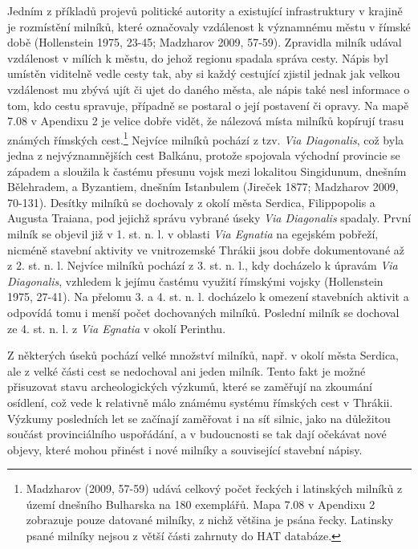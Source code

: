 Jedním z příkladů projevů politické autority a existující infrastruktury v krajině je rozmístění milníků, které označovaly vzdálenost k významnému městu v římské době (Hollenstein 1975, 23-45; Madzharov 2009, 57-59). Zpravidla milník udával vzdálenost v mílích k městu, do jehož regionu spadala správa cesty. Nápis byl umístěn viditelně vedle cesty tak, aby si každý cestující zjistil jednak jak velkou vzdálenost mu zbývá ujít či ujet do daného města, ale nápis také nesl informace o tom, kdo cestu spravuje, případně se postaral o její postavení či opravy. Na mapě 7.08 v Apendixu 2 je velice dobře vidět, že nálezová místa milníků kopírují trasu známých římských cest.\footnote{Madzharov (2009, 57-59) udává celkový počet řeckých i latinských milníků z území dnešního Bulharska na 180 exemplářů. Mapa 7.08 v Apendixu 2 zobrazuje pouze datované milníky, z nichž většina je psána řecky. Latinsky psané milníky nejsou z větší části zahrnuty do HAT databáze.} Nejvíce milníků pochází z tzv. {\em Via Diagonalis}, což byla jedna z nejvýznamnějších cest Balkánu, protože spojovala východní provincie se západem a sloužila k častému přesunu vojsk mezi lokalitou Singidunum, dnešním Bělehradem, a Byzantiem, dnešním Istanbulem (Jireček 1877; Madzharov 2009, 70-131). Desítky milníků se dochovaly z okolí města Serdica, Filippopolis a Augusta Traiana, pod jejichž správu vybrané úseky {\em Via Diagonalis} spadaly. První milník se objevil již v 1. st. n. l. v oblasti {\em Via Egnatia} na egejském pobřeží, nicméně stavební aktivity ve vnitrozemské Thrákii jsou dobře dokumentované až z 2. st. n. l. Nejvíce milníků pochází z 3. st. n. l., kdy docházelo k úpravám {\em Via Diagonalis}, vzhledem k jejímu častému využití římskými vojsky (Hollenstein 1975, 27-41). Na přelomu 3. a 4. st. n. l. docházelo k omezení stavebních aktivit a odpovídá tomu i menší počet dochovaných milníků. Poslední milník se dochoval ze 4. st. n. l. z {\em Via Egnatia} v okolí Perinthu.

Z některých úseků pochází velké množství milníků, např. v okolí města Serdica, ale z velké části cest se nedochoval ani jeden milník. Tento fakt je možné přisuzovat stavu archeologických výzkumů, které se zaměřují na zkoumání osídlení, což vede k relativně málo známému systému římských cest v Thrákii. Výzkumy posledních let se začínají zaměřovat i na síť silnic, jako na důležitou součást provinciálního uspořádání, a v budoucnosti se tak dají očekávat nové objevy, které mohou přinést i nové milníky a související stavební nápisy.

